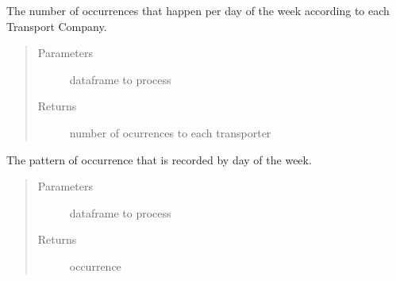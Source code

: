 \documentclass[letterpaper,10pt,english]{sphinxmanual}
\begin{document}
\begin{fulllineitems}
\label{\detokenize{algorithms:algorithms.idp.idp.get_df_ocurrences_day_transporter}}
\sphinxAtStartPar
The number of occurrences that happen per day of the week according to each Transport Company.
\begin{quote}\begin{description}
\item[{Parameters}] \leavevmode
\sphinxAtStartPar
{} \textendash{} dataframe to process

\item[{Returns}] \leavevmode
\sphinxAtStartPar
number of ocurrences to each transporter

\end{description}\end{quote}

\end{fulllineitems}


\begin{fulllineitems}
\label{\detokenize{algorithms:algorithms.idp.idp.get_df_pattern_occurrence_day_week}}
\sphinxAtStartPar
The pattern of occurrence that is recorded by day of the week.
\begin{quote}\begin{description}
\item[{Parameters}] \leavevmode
\sphinxAtStartPar
{} \textendash{} dataframe to process

\item[{Returns}] \leavevmode
\sphinxAtStartPar
occurrence

\end{description}\end{quote}

\end{fulllineitems}

\end{document}
